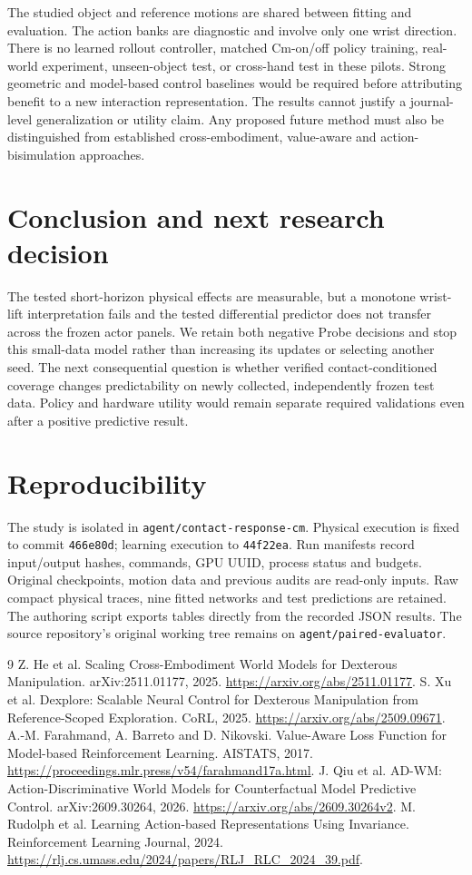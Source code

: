 \documentclass[10pt]{article}
\begin{document}
The studied object and reference motions are shared between fitting and evaluation.
The action banks are diagnostic and involve only one wrist direction. There is no
learned rollout controller, matched Cm-on/off policy training, real-world experiment,
unseen-object test, or cross-hand test in these pilots. Strong geometric and model-based
control baselines would be required before attributing benefit to a new interaction
representation. The results cannot justify a journal-level generalization or utility
claim. Any proposed future method must also be distinguished from established
cross-embodiment, value-aware and action-bisimulation approaches.

\section{Conclusion and next research decision}
The tested short-horizon physical effects are measurable, but a monotone wrist-lift
interpretation fails and the tested differential predictor does not transfer across
the frozen actor panels. We retain both negative Probe decisions and stop this
small-data model rather than increasing its updates or selecting another seed.
The next consequential question is whether verified contact-conditioned coverage
changes predictability on newly collected, independently frozen test data. Policy
and hardware utility would remain separate required validations even after a positive
predictive result.

\section*{Reproducibility}
The study is isolated in \texttt{agent/contact-response-cm}. Physical execution is
fixed to commit \texttt{466e80d}; learning execution to \texttt{44f22ea}.
Run manifests record input/output hashes, commands, GPU UUID, process status and budgets.
Original checkpoints, motion data and previous audits are read-only inputs.
Raw compact physical traces, nine fitted networks and test predictions are retained.
The authoring script exports tables directly from the recorded JSON results. The
source repository's original working tree remains on \texttt{agent/paired-evaluator}.

\begin{thebibliography}{9}
 Z. He et al. Scaling Cross-Embodiment World Models for Dexterous Manipulation.
arXiv:2511.01177, 2025. \url{https://arxiv.org/abs/2511.01177}.
 S. Xu et al. Dexplore: Scalable Neural Control for Dexterous Manipulation
from Reference-Scoped Exploration. CoRL, 2025. \url{https://arxiv.org/abs/2509.09671}.
 A.-M. Farahmand, A. Barreto and D. Nikovski. Value-Aware Loss Function
for Model-based Reinforcement Learning. AISTATS, 2017.
\url{https://proceedings.mlr.press/v54/farahmand17a.html}.
 J. Qiu et al. AD-WM: Action-Discriminative World Models for Counterfactual
Model Predictive Control. arXiv:2609.30264, 2026. \url{https://arxiv.org/abs/2609.30264v2}.
 M. Rudolph et al. Learning Action-based Representations Using Invariance.
Reinforcement Learning Journal, 2024.
\url{https://rlj.cs.umass.edu/2024/papers/RLJ_RLC_2024_39.pdf}.
\end{thebibliography}
\end{document}
